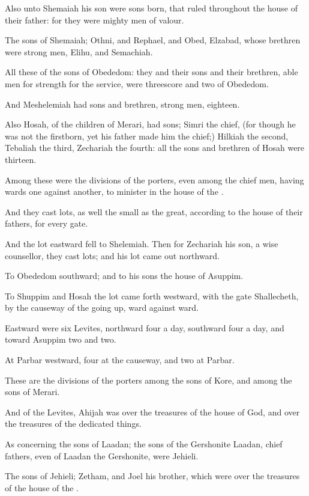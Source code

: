 \Verse Also unto Shemaiah his son were sons born, that ruled throughout the house of their father: for they were mighty men of valour.

\Verse The sons of Shemaiah; Othni, and Rephael, and Obed, Elzabad, whose brethren were strong men, Elihu, and Semachiah.

\Verse All these of the sons of Obededom: they and their sons and their brethren, able men for strength for the service, were threescore and two of Obededom.

\Verse And Meshelemiah had sons and brethren, strong men, eighteen.

\Verse Also Hosah, of the children of Merari, had sons; Simri the chief, (for though he was not the firstborn, yet his father made him the chief;) \Verse Hilkiah the second, Tebaliah the third, Zechariah the fourth: all the sons and brethren of Hosah were thirteen.

\Verse Among these were the divisions of the porters, even among the chief men, having wards one against another, to minister in the house of the \LORD.

\Verse And they cast lots, as well the small as the great, according to the house of their fathers, for every gate.

\Verse And the lot eastward fell to Shelemiah. Then for Zechariah his son, a wise counsellor, they cast lots; and his lot came out northward.

\Verse To Obededom southward; and to his sons the house of Asuppim.

\Verse To Shuppim and Hosah the lot came forth westward, with the gate Shallecheth, by the causeway of the going up, ward against ward.

\Verse Eastward were six Levites, northward four a day, southward four a day, and toward Asuppim two and two.

\Verse At Parbar westward, four at the causeway, and two at Parbar.

\Verse These are the divisions of the porters among the sons of Kore, and among the sons of Merari.

\Verse And of the Levites, Ahijah was over the treasures of the house of God, and over the treasures of the dedicated things.

\Verse As concerning the sons of Laadan; the sons of the Gershonite Laadan, chief fathers, even of Laadan the Gershonite, were Jehieli.

\Verse The sons of Jehieli; Zetham, and Joel his brother, which were over the treasures of the house of the \LORD.

